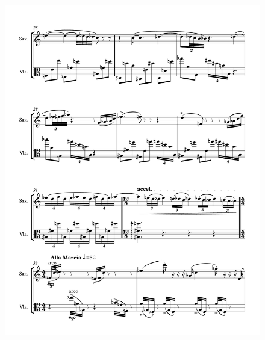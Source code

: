 \begin{figure}[htbp]
    \centering
	\includegraphics[width=6.5in]{figures/Sax_Viola_17.pdf}
\end{figure}

